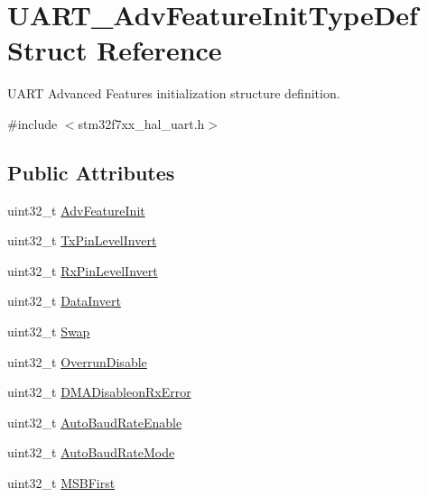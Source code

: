 \hypertarget{struct_u_a_r_t___adv_feature_init_type_def}{}\section{U\+A\+R\+T\+\_\+\+Adv\+Feature\+Init\+Type\+Def Struct Reference}
\label{struct_u_a_r_t___adv_feature_init_type_def}


U\+A\+RT Advanced Features initialization structure definition.  




{\ttfamily \#include $<$stm32f7xx\+\_\+hal\+\_\+uart.\+h$>$}

\subsection*{Public Attributes}
\begin{DoxyCompactItemize}
\item 
uint32\+\_\+t \mbox{\hyperlink{struct_u_a_r_t___adv_feature_init_type_def_a3182d0787600d70cb3c2a9d68a86e645}{Adv\+Feature\+Init}}
\item 
uint32\+\_\+t \mbox{\hyperlink{struct_u_a_r_t___adv_feature_init_type_def_ad127398802b667228c2ccb5dd5272bb5}{Tx\+Pin\+Level\+Invert}}
\item 
uint32\+\_\+t \mbox{\hyperlink{struct_u_a_r_t___adv_feature_init_type_def_a85fecac9f89ae9916dbfde4689a3bc9b}{Rx\+Pin\+Level\+Invert}}
\item 
uint32\+\_\+t \mbox{\hyperlink{struct_u_a_r_t___adv_feature_init_type_def_aec98c08519e2f0c713b2c2a0213e0772}{Data\+Invert}}
\item 
uint32\+\_\+t \mbox{\hyperlink{struct_u_a_r_t___adv_feature_init_type_def_a1bc32023897ca98005319c4de7b84a1f}{Swap}}
\item 
uint32\+\_\+t \mbox{\hyperlink{struct_u_a_r_t___adv_feature_init_type_def_af2079d3cf82744589352950855551bbb}{Overrun\+Disable}}
\item 
uint32\+\_\+t \mbox{\hyperlink{struct_u_a_r_t___adv_feature_init_type_def_a63254643e43080158d23d3bbe9d53430}{D\+M\+A\+Disableon\+Rx\+Error}}
\item 
uint32\+\_\+t \mbox{\hyperlink{struct_u_a_r_t___adv_feature_init_type_def_aa329d2b83700bfe0de99708eb3f7a465}{Auto\+Baud\+Rate\+Enable}}
\item 
uint32\+\_\+t \mbox{\hyperlink{struct_u_a_r_t___adv_feature_init_type_def_a2f962d68e84dd709079aadcadd9d11cc}{Auto\+Baud\+Rate\+Mode}}
\item 
uint32\+\_\+t \mbox{\hyperlink{struct_u_a_r_t___adv_feature_init_type_def_a64f5cd00608df17cc6be37e98744f9ab}{M\+S\+B\+First}}
\end{DoxyCompactItemize}


